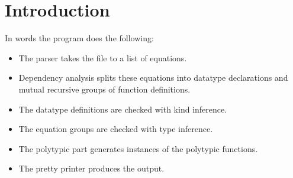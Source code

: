 \chapter{Introduction}
In words the program does the following: 
\begin{itemize}
\item The parser takes the file to a list of equations. 
\item Dependency analysis splits these equations into datatype
  declarations and mutual recursive groups of function definitions.
\item The datatype definitions are checked with kind inference.
\item The equation groups are checked with type inference.
\item The polytypic part generates instances of the polytypic functions.
\item The pretty printer produces the output.
\end{itemize}
